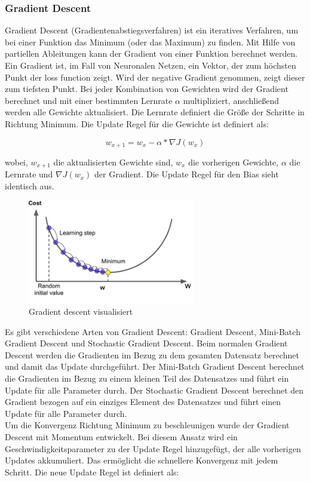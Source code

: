 \subsubsection{Gradient Descent}
Gradient Descent (Gradientenabstiegsverfahren) ist ein iteratives Verfahren, um bei einer Funktion das Minimum (oder das Maximum) zu finden. 
Mit Hilfe von partiellen Ableitungen kann der Gradient von einer Funktion berechnet werden. Ein Gradient ist, im Fall von Neuronalen
Netzen, ein Vektor, der zum höchsten Punkt der \gls{loss function} zeigt. Wird der negative Gradient genommen, zeigt dieser zum tiefsten Punkt.
Bei jeder Kombination von Gewichten wird der Gradient berechnet und mit einer bestimmten Lernrate $ \alpha $ multipliziert, anschließend werden 
alle Gewichte aktualisiert. Die Lernrate definiert die Größe der Schritte in Richtung Minimum. Die Update Regel für die Gewichte ist definiert als:

\begin{equation}
  w_{x+1} = w_x - \alpha * \nabla J(w_x)
\end{equation}

wobei, $w_{x+1}$ die aktualisierten Gewichte sind, $w_x$ die vorherigen Gewichte, $ \alpha $ die Lernrate und $\nabla J(w_x)$ der Gradient. 
Die Update Regel für den Bias sieht identisch aus.

\begin{figure}[H]
  \centering
  \includegraphics[width=0.65\textwidth]{resources/cnn/gradient-descent.jpg}
  \caption{
    Gradient descent visualisiert
    \cite{gradient-descent}
  }
  \label{image:gradient-descent}
\end{figure}

Es gibt verschiedene Arten von Gradient Descent: Gradient Descent, Mini-Batch Gradient Descent und Stochastic Gradient Descent. 
Beim normalen Gradient Descent
werden die Gradienten im Bezug zu dem gesamten Datensatz berechnet und damit das Update durchgeführt. Der Mini-Batch Gradient Descent berechnet 
die Gradienten im Bezug zu einem kleinen Teil des Datensatzes und führt ein Update für alle Parameter durch. Der Stochastic Gradient Descent 
berechnet den Gradient bezogen auf ein einziges Element des Datensatzes und führt einen Update für alle Parameter durch.
\\
Um die Konvergenz Richtung Minimum zu beschleunigen wurde der Gradient Descent mit Momentum entwickelt. Bei diesem Ansatz wird ein
Geschwindigkeitsparameter zu der Update Regel hinzugefügt, der alle vorherigen Updates akkumuliert. 
Das ermöglicht die schnellere Konvergenz mit jedem Schritt. Die neue Update Regel ist definiert als:

